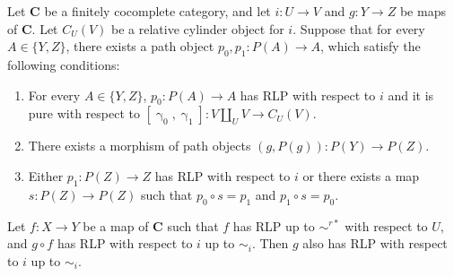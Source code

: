\documentclass{tac}
\theoremstyle{definition}
\newcommand{\cat}[1]{\mathbf{#1}}
\newcommand{\C}{\cat{C}}
\newcommand{\cyli}{\upgamma}
\begin{document}
\begin{lem}[we-bot]
Let $\C$ be a finitely cocomplete category, and let $i : U \to V$ and $g : Y \to Z$ be maps of $\C$.
Let $C_U(V)$ be a relative cylinder object for $i$.
Suppose that for every $A \in \{ Y, Z \}$, there exists a path object $p_0,p_1 : P(A) \to A$, which satisfy the following conditions:
\begin{enumerate}
\item For every $A \in \{ Y, Z \}$, $p_0 : P(A) \to A$ has RLP with respect to $i$ and it is pure with respect to $[\cyli_0,\cyli_1] : V \amalg_U V \to C_U(V)$.
\item There exists a morphism of path objects $(g,P(g)) : P(Y) \to P(Z)$.
\item Either $p_1 : P(Z) \to Z$ has RLP with respect to $i$ or there exists a map $s : P(Z) \to P(Z)$ such that $p_0 \circ s = p_1$ and $p_1 \circ s = p_0$.
\end{enumerate}

Let $f : X \to Y$ be a map of $\C$ such that $f$ has RLP up to $\sim^{r*}$ with respect to $U$, and $g \circ f$ has RLP with respect to $i$ up to $\sim_i$.
Then $g$ also has RLP with respect to $i$ up to $\sim_i$.
\end{lem}
\end{document}

